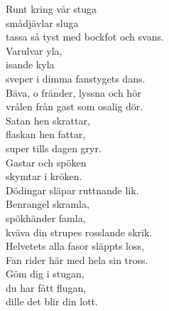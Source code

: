 \documentclass[a6paper,10pt]{article}
\begin{document}
\setlength{\oddsidemargin}{-0.37in}
\begin{center}
\end{center}
\begin{lyrics}
\small Runt kring vår stuga\\ 
smådjävlar sluga\\ 
tassa så tyst med bockfot och svans.\\ 
Varulvar yla,\\ 
isande kyla\\ 
sveper i dimma fanstygets dans.
\vspace{5pt}\\ 
Bäva, o fränder, lyssna och hör\\ 
vrålen från gast som osalig dör.\\ 
Satan hen skrattar,\\ 
flaskan hen fattar,\\ 
super tills dagen gryr.
\vspace{5pt}\\ 
Gastar och spöken\\ 
skymtar i kröken.\\ 
Dödingar släpar ruttnande lik.\\ 
Benrangel skramla,\\ 
spökhänder famla,\\ 
kväva din strupes rosslande skrik.
\vspace{5pt}\\ 
Helvetets alla fasor släppts loss,\\ 
Fan rider här med hela sin tross.\\ 
Göm dig i stugan,\\ 
du har fått flugan,\\ 
dille det blir din lott.\\
\end{lyrics}
\end{document}
